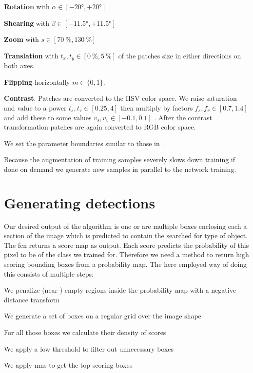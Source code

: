 \begin{my_list_item}
    \item \textbf{Rotation} with $\alpha\in[-\ang{20}, +\ang{20}]$
    \item \textbf{Shearing} with $\beta\in[-\ang{11.5}, + \ang{11.5}]$
    \item \textbf{Zoom} with $s\in[\SI{70}{\percent}, \SI{130}{\percent}]$
    \item \textbf{Translation} with $t_x,t_y\in[\SI{0}{\percent}, \SI{5}{\percent}]$ of the patches size in either directions on both axes.
    \item \textbf{Flipping} horizontally $m\in\{0,1\}$.
    \item \textbf{Contrast}. Patches are converted to the HSV color space. We raise saturation and value to a power $t_s, t_v \in [0.25, 4]$ then multiply by factors $f_s, f_v \in [0.7, 1.4]$ and add these to some values $v_s, v_v \in [-0.1, 0.1]$ \citep{dosovitskiy_discriminative_2014}. After the contrast transformation patches are again converted to RGB color space.
\end{my_list_item}
We set the parameter boundaries similar to those in \citet{dosovitskiy_discriminative_2014}.

Because the augmentation of training samples severely slows down training if done on demand we generate new samples in parallel to the network training.


\section{Generating detections}
\label{sec:pipeline:eval}
Our desired output of the algorithm is one or are multiple boxes enclosing each a section of the image which is predicted to contain the searched for type of object. The \gls{fcn} returns a score map as output. Each score predicts the probability of this pixel to be of the class we trained for. Therefore we need a method to return high scoring bounding boxes from a probability map. The here employed way of doing this consists of multiple steps:\\
\begin{my_list_num}
    \item We penalize (near-) empty regions inside the probability map with a negative distance transform
    \item We generate a set of boxes on a regular grid over the image shape
    \item For all those boxes we calculate their density of scores
    \item We apply a low threshold to filter out unnecessary boxes
    \item We apply \gls{nms} to get the top scoring boxes
\end{my_list_num}

